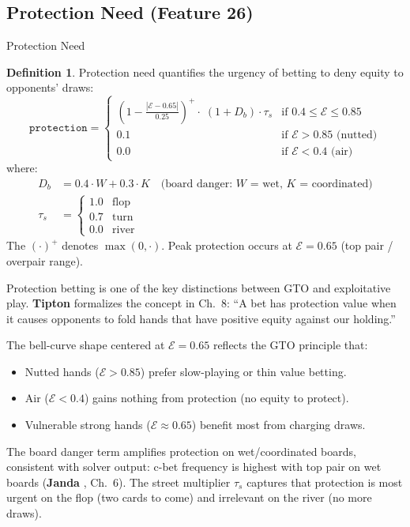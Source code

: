 \documentclass[11pt, a4paper]{article}
\theoremstyle{definition}
\newtheorem{definition}{Definition}[section]
\newcommand{\feature}[1]{\texttt{#1}}
\begin{document}
\subsection{Protection Need (Feature 26)}

\begin{featurebox}{Protection Need}
\begin{definition}
Protection need quantifies the urgency of betting to deny equity to opponents' draws:
\begin{equation}
    \feature{protection} = \begin{cases}
        \displaystyle \left(1 - \frac{|\mathcal{E} - 0.65|}{0.25}\right)^+ \!\cdot\; (1 + D_b) \cdot \tau_s & \text{if } 0.4 \leq \mathcal{E} \leq 0.85 \\[8pt]
        0.1 & \text{if } \mathcal{E} > 0.85 \text{ (nutted)} \\
        0.0 & \text{if } \mathcal{E} < 0.4 \text{ (air)}
    \end{cases}
\end{equation}
where:
\begin{align}
    D_b &= 0.4 \cdot W + 0.3 \cdot K \quad \text{(board danger: $W$ = wet, $K$ = coordinated)} \\
    \tau_s &= \begin{cases} 1.0 & \text{flop} \\ 0.7 & \text{turn} \\ 0.0 & \text{river} \end{cases}
\end{align}
The $(\cdot)^+$ denotes $\max(0, \cdot)$. Peak protection occurs at $\mathcal{E} = 0.65$ (top pair / overpair range).
\end{definition}
\end{featurebox}

\begin{refbox}
Protection betting is one of the key distinctions between GTO and exploitative play. \textbf{Tipton} \cite{tipton2019} formalizes the concept in Ch.~8: ``A bet has protection value when it causes opponents to fold hands that have positive equity against our holding.'' 

The bell-curve shape centered at $\mathcal{E} = 0.65$ reflects the GTO principle that:
\begin{itemize}
    \item Nutted hands ($\mathcal{E} > 0.85$) prefer slow-playing or thin value betting.
    \item Air ($\mathcal{E} < 0.4$) gains nothing from protection (no equity to protect).
    \item Vulnerable strong hands ($\mathcal{E} \approx 0.65$) benefit most from charging draws.
\end{itemize}
The board danger term amplifies protection on wet/coordinated boards, consistent with solver output: c-bet frequency is highest with top pair on wet boards (\textbf{Janda} \cite{janda2017}, Ch.~6). The street multiplier $\tau_s$ captures that protection is most urgent on the flop (two cards to come) and irrelevant on the river (no more draws).
\end{refbox}
\end{document}
